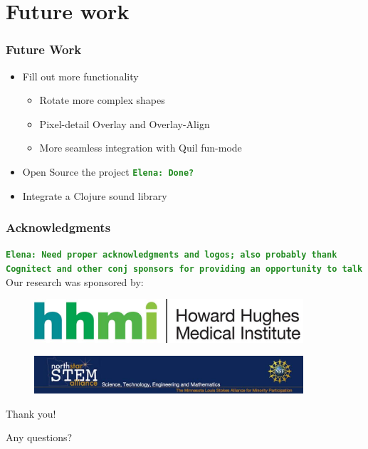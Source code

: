 \documentclass{beamer}
\newcommand{\comment}[1]{{\bf \tt  {#1}}}
\newcommand{\emcomment}[1]{\textcolor{ForestGreen}{\comment{Elena: {#1}}}}
\begin{document}
\section{Future work}

\begin{frame}
	\frametitle{Future Work}
	\begin{itemize}
		\item Fill out more functionality
		\begin{itemize}
			\item Rotate more complex shapes
			\item Pixel-detail Overlay and Overlay-Align
			\item More seamless integration with Quil fun-mode
		\end{itemize}
		\item Open Source the project \emcomment{Done?}
		\item Integrate a Clojure sound library
	\end{itemize}
\end{frame}

\begin{frame}
\frametitle{Acknowledgments}
\emcomment{Need proper acknowledgments and logos; also probably thank Cognitect and other conj sponsors for providing an opportunity to talk}
	Our research was sponsored by:
	\begin{figure}
		\includegraphics[width=10cm]{PresentationImages/logoHHMI.jpg}
	\end{figure}
	\begin{figure}
		\includegraphics[width=10cm]{PresentationImages/logoStem.jpg}
	\end{figure}
	{\centering
	\noindent
	Thank you! \par
	Any questions? \par
	}
\end{frame}
\end{document}
